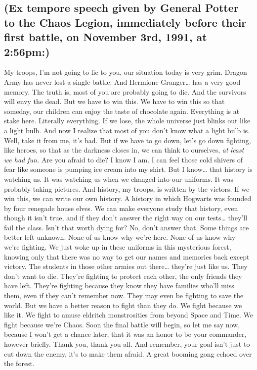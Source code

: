 \subsection{(Ex tempore speech given by General Potter to the Chaos Legion, 
immediately before their first battle, on November 3rd, 1991, at 2:56pm:)}

My troops, I'm not going to lie to you, our situation today is very grim. 
Dragon Army has never lost a single battle. And Hermione Granger{\ldots} has a 
very good memory. The truth is, most of you are probably going to die. And the 
survivors will envy the dead. But we have to win this. We have to win this so 
that someday, our children can enjoy the taste of chocolate again. Everything 
is at stake here. Literally everything. If we lose, the whole universe just 
blinks out like a light bulb. And now I realize that most of you don't know 
what a light bulb is. Well, take it from me, it's bad. But if we have to go 
down, let's go down fighting, like heroes, so that as the darkness closes in, 
we can think to ourselves, \emph{at least we had fun.} Are you afraid to die? I 
know I am. I can feel those cold shivers of fear like someone is pumping ice 
cream into my shirt. But I know{\ldots} that history is watching us. It was 
watching us when we changed into our uniforms. It was probably taking pictures. 
And history, my troops, is written by the victors. If we win this, we can write 
our own history. A history in which Hogwarts was founded by four renegade house 
elves. We can make everyone study that history, even though it isn't true, and 
if they don't answer the right way on our tests{\ldots} they'll fail the class. 
Isn't that worth dying for? No, don't answer that. Some things are better left 
unknown. None of us know why we're here. None of us know why we're fighting. We 
just woke up in these uniforms in this mysterious forest, knowing only that 
there was no way to get our names and memories back except victory. The 
students in those other armies out there{\ldots} they're just like us. They 
don't want to die. They're fighting to protect each other, the only friends 
they have left. They're fighting because they know they have families who'll 
miss them, even if they can't remember now. They may even be fighting to save 
the world. But we have a better reason to fight than they do. We fight because 
we like it. We fight to amuse eldritch monstrosities from beyond Space and 
Time. We fight because we're Chaos. Soon the final battle will begin, so let me 
say now, because I won't get a chance later, that it was an honor to be your 
commander, however briefly. Thank you, thank you all. And remember, your goal 
isn't just to cut down the enemy, it's to make them afraid.
\sbreak
A great booming gong echoed over the forest.

